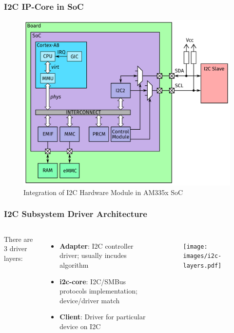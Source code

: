 \documentclass[aspectratio=169,usenames,dvipsnames]{beamer}
\newcounter{cont}
\begin{document}
\begin{frame}
  \frametitle{I2C IP-Core in SoC}
  \begin{figure}
    \centering
    \vspace*{-3mm}
    \includegraphics[scale=0.2]{images/architecture-i2c.pdf}
    \vspace*{-3mm}
    \caption{Integration of I2C Hardware Module in AM335x SoC}
  \end{figure}
  \vspace*{-12mm}
\end{frame}

\begin{frame}
  \frametitle{I2C Subsystem Driver Architecture}
  \begin{columns}
      There are 3 driver layers:
      \begin{itemize}
        \item \textbf{Adapter}: I2C controller driver; usually incudes algorithm
        \item \textbf{i2c-core}: I2C/SMBus protocols implementation;
              device/driver match
        \item \textbf{Client}: Driver for particular device on I2C
      \end{itemize}
      \vspace*{-3mm}
      \begin{figure}
        \centering
        \texttt{[image: images/i2c-layers.pdf]}
      \end{figure}
      \vspace*{-9mm}
  \end{columns}
\end{frame}
\end{document}
